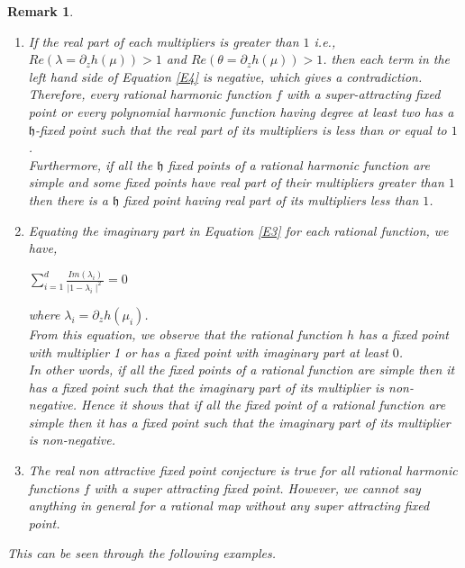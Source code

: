 \documentclass[a4paper,12pt,reqno]{amsart}
\newtheorem*{remark}{Remark}
\begin{document}
\begin{remark}
\begin{enumerate}


\item[1.] If the real part of each multipliers is greater than $1$ i.e., $Re\left( \lambda=\partial_{z}h(\mu)\right)>1$ and $Re\left( \theta=\partial_{z}h(\mu)\right)>1$. then each term in the left hand side of Equation \ref{E4} is negative, which gives a contradiction. Therefore, every rational harmonic function $f$ with a super-attracting fixed point or every polynomial harmonic function having degree at least two has a $\mathfrak{h}$-fixed point such that the real part of its multipliers is less than or equal to $1$.\\
Furthermore, if all the $\mathfrak{h}$ fixed points of a rational harmonic function are simple and some fixed points have real part of their multipliers greater than $1$ then there is a $\mathfrak{h}$ fixed point having real part of its multipliers less than $1$.

\item[2.] Equating the imaginary part in Equation \ref{E3} for each rational function, we have,
\begin{center}
$\displaystyle\sum_{i=1}^{d}\frac{Im(\lambda_{i})}{\mid 1-\lambda_{i}\mid^{2}}=0$
\end{center}
 where $\lambda_{i}=\partial_{z}h(\mu_{i})$.\\
 
 From this equation, we observe that the rational function $h$ has a fixed point with multiplier 1 or has a fixed point with imaginary part at least $0$.\\
In other words, if all the fixed points of a rational function are simple then it has a fixed point such that the imaginary part of its multiplier is non-negative.
Hence it shows that if all the fixed point of a rational function are simple then it has a fixed point such that the imaginary part of its multiplier is non-negative.
\item[3.] The real non attractive fixed point conjecture is true for all rational harmonic functions $f$ with a super attracting fixed point.
However, we cannot say anything in general for a rational map without any super attracting fixed point.
\end{enumerate}
This can be seen through the following examples.
\end{remark}
\end{document}
